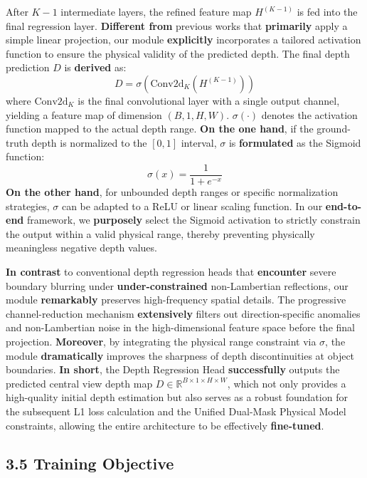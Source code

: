 After $K-1$ intermediate layers, the refined feature map $H^{(K-1)}$ is fed into the final regression layer. \textbf{Different from} previous works that \textbf{primarily} apply a simple linear projection, our module \textbf{explicitly} incorporates a tailored activation function to ensure the physical validity of the predicted depth. The final depth prediction $D$ is \textbf{derived} as:
\[
\begin{equation}
D = \sigma(\text{Conv2d}_{K}(H^{(K-1)}))
\end{equation}
\]
where $\text{Conv2d}_{K}$ is the final convolutional layer with a single output channel, yielding a feature map of dimension $(B, 1, H, W)$. $\sigma(\cdot)$ denotes the activation function mapped to the actual depth range. \textbf{On the one hand}, if the ground-truth depth is normalized to the $[0, 1]$ interval, $\sigma$ is \textbf{formulated} as the Sigmoid function:
\[
\begin{equation}
\sigma(x) = \frac{1}{1 + e^{-x}}
\end{equation}
\]
\textbf{On the other hand}, for unbounded depth ranges or specific normalization strategies, $\sigma$ can be adapted to a ReLU or linear scaling function. In our \textbf{end-to-end} framework, we \textbf{purposely} select the Sigmoid activation to strictly constrain the output within a valid physical range, thereby preventing physically meaningless negative depth values.

\textbf{In contrast} to conventional depth regression heads that \textbf{encounter} severe boundary blurring under \textbf{under-constrained} non-Lambertian reflections, our module \textbf{remarkably} preserves high-frequency spatial details. The progressive channel-reduction mechanism \textbf{extensively} filters out direction-specific anomalies and non-Lambertian noise in the high-dimensional feature space before the final projection. \textbf{Moreover}, by integrating the physical range constraint via $\sigma$, the module \textbf{dramatically} improves the sharpness of depth discontinuities at object boundaries. \textbf{In short}, the Depth Regression Head \textbf{successfully} outputs the predicted central view depth map $D \in \mathbb{R}^{B \times 1 \times H \times W}$, which not only provides a high-quality initial depth estimation but also serves as a robust foundation for the subsequent L1 loss calculation and the Unified Dual-Mask Physical Model constraints, allowing the entire architecture to be effectively \textbf{fine-tuned}.

\subsection{3.5 Training Objective}

